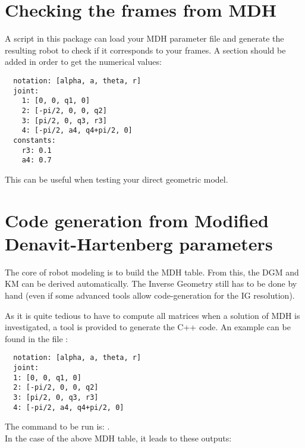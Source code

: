 \documentclass{ecnreport}
\begin{document}
  
  \newpage

   \section{Checking the frames from MDH}\label{dhframes}

   A script in this package can load your MDH parameter file and generate the resulting robot to check if it corresponds to your frames.
   A section  should be added in order to get the numerical values:

  \cppstyle
  \begin{lstlisting}
  notation: [alpha, a, theta, r]
  joint:
    1: [0, 0, q1, 0]
    2: [-pi/2, 0, 0, q2]
    3: [pi/2, 0, q3, r3]
    4: [-pi/2, a4, q4+pi/2, 0]
  constants:
    r3: 0.1
    a4: 0.7
  \end{lstlisting}

  This can be useful when testing your direct geometric model.



  \section{Code generation from Modified Denavit-Hartenberg parameters}\label{dhcode}

  The core of robot modeling is to build the MDH table. From this, the DGM and KM can be derived automatically. The Inverse Geometry still has to be done by hand (even if some advanced tools allow code-generation for the IG resolution).

  As it is quite tedious to have to compute all matrices when a solution of MDH is investigated, a tool is provided to generate the C++ code. An example can be found in the file :
  \cppstyle
  \begin{lstlisting}
  notation: [alpha, a, theta, r]
  joint:
  1: [0, 0, q1, 0]
  2: [-pi/2, 0, 0, q2]
  3: [pi/2, 0, q3, r3]
  4: [-pi/2, a4, q4+pi/2, 0]
  \end{lstlisting}
  The command to be run is: .\\
  In the case of the above MDH table, it leads to these outputs:
\end{document}
